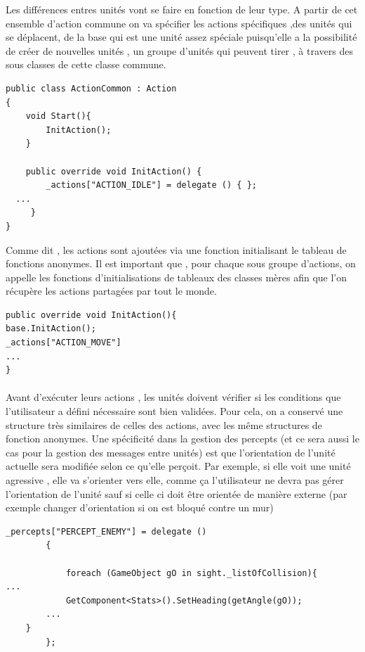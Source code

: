 \documentclass{report}
\begin{document}
Les différences entres unités vont se faire en fonction de leur type. A partir de cet ensemble d’action commune on va spécifier les actions spécifiques ,des unités qui se déplacent, de la base qui est une unité assez spéciale puisqu’elle a la possibilité de créer de nouvelles unités ,  un groupe d’unités qui peuvent tirer , à travers des sous classes de cette classe commune.

\begin{lstlisting}[frame=single]
public class ActionCommon : Action
{
    void Start(){
        InitAction();
    }

    public override void InitAction() {
        _actions["ACTION_IDLE"] = delegate () { };
  ...
     }
}
\end{lstlisting}

Comme dit , les actions sont ajoutées via une fonction initialisant le tableau de fonctions anonymes. Il est important que , pour chaque sous groupe d’actions, on appelle les fonctions d’initialisations de tableaux des classes mères afin que l’on récupère les actions partagées par tout le monde.
\begin{lstlisting}[frame=single]
  public override void InitAction(){
base.InitAction();
_actions["ACTION_MOVE"] 
...
}
\end{lstlisting}

\paragraph{}

Avant d'exécuter leurs actions , les unités doivent vérifier si les conditions que l’utilisateur a défini nécessaire sont bien validées. Pour cela, on a conservé une structure très similaires de celles des actions, avec les même structures de fonction anonymes. 
Une spécificité dans la gestion des percepts (et ce sera aussi le cas pour la gestion des messages entre unités) est que l’orientation de l’unité actuelle sera modifiée selon ce qu’elle perçoit. Par exemple, si elle voit une unité agressive , elle va s’orienter vers elle, comme ça l’utilisateur ne devra pas gérer l’orientation de l’unité sauf si celle ci doit être orientée de manière externe (par exemple changer d’orientation si on est bloqué contre un mur)

\begin{lstlisting}[frame=single]
_percepts["PERCEPT_ENEMY"] = delegate ()
        {
            
            foreach (GameObject gO in sight._listOfCollision){
...
            GetComponent<Stats>().SetHeading(getAngle(gO));
        ...
    }
        };
\end{lstlisting}
\end{document}
